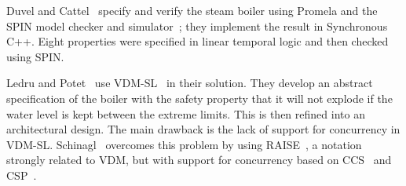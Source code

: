 \documentclass{report}
\begin{document}
Duvel and Cattel~\cite{duval-cattel-96} specify and verify the steam
boiler using Promela and the SPIN model checker and
simulator~\cite{holzmann-91, holzmann-93, holzmann-95}; they implement
the result in Synchronous C++.  Eight properties were specified in
linear temporal logic and then checked using SPIN.

Ledru and Potet~\cite{ledru-potet-96} use VDM-SL~\cite{jones-90,
  andrews-bruun-hansen-larsen-plat-95} in their solution.  They
develop an abstract specification of the boiler with the safety
property that it will not explode if the water level is kept between
the extreme limits.  This is then refined into an architectural
design.  The main drawback is the lack of support for concurrency in
VDM-SL.  Schinagl~\cite{schinagl-96} overcomes this problem by using
RAISE~\cite{raise-92}, a notation strongly related to VDM, but with
support for concurrency based on CCS~\cite{milner-89} and
CSP~\cite{hoare-85}.

\end{document}
